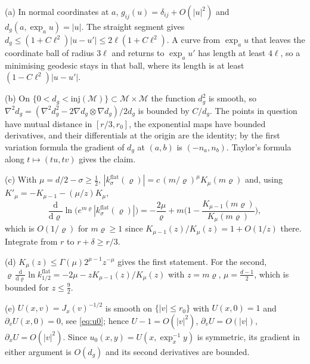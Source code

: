 \documentclass[11pt,a4paper]{article}
\makeatletter
\theoremstyle{stmt}
\theoremstyle{defn}
\theoremstyle{rmk}
\renewenvironment{proof}[1][\proofname]{\par\pushQED{\qed}\normalfont\topsep6\p@\@plus6\p@\relax
  \trivlist\item[\hskip\labelsep{\sffamily\itshape\small #1.}]\ignorespaces}{\popQED\endtrivlist\@endpefalse}
\numberwithin{equation}{section}
\newcommand{\M}{\mathcal{M}}
\newcommand{\dd}{\mathrm{d}}
\makeatother
\begin{document}
\begin{proof}
(a) In normal coordinates at $a$, $g_{ij}(u)=\delta_{ij}+O(|u|^2)$ and $d_g(a,\exp_au)=|u|$. The straight segment gives $d_g\le(1+C\ell^2)|u-u'|\le2\ell(1+C\ell^2)$. A curve from $\exp_au$ that leaves the coordinate ball of radius $3\ell$ and returns to $\exp_au'$ has length at least $4\ell$, so a minimising geodesic stays in that ball, where its length is at least $(1-C\ell^2)|u-u'|$.

(b) On $\{0<d_g<\mathrm{inj}(\M)\}\subset\M\times\M$ the function $d_g^2$ is smooth, so $\nabla^2d_g=(\nabla^2d_g^2-2\nabla d_g\otimes\nabla d_g)/2d_g$ is bounded by $C/d_g$. The points in question have mutual distance in $[r/3,r_0]$, the exponential maps have bounded derivatives, and their differentials at the origin are the identity; by the first variation formula the gradient of $d_g$ at $(a,b)$ is $(-n_a,n_b)$. Taylor's formula along $t\mapsto(tu,tv)$ gives the claim.

(c) With $\mu=d/2-\sigma\ge\tfrac12$, $|k^{\mathrm{flat}}_\sigma(\varrho)|=c\,(m/\varrho)^\mu K_\mu(m\varrho)$ and, using $K'_\mu=-K_{\mu-1}-(\mu/z)K_\mu$,
\[
\frac{\dd}{\dd\varrho}\ln\big(e^{m\varrho}|k^{\mathrm{flat}}_\sigma(\varrho)|\big)=-\frac{2\mu}{\varrho}+m\Big(1-\frac{K_{\mu-1}(m\varrho)}{K_\mu(m\varrho)}\Big),
\]
which is $O(1/\varrho)$ for $m\varrho\ge1$ since $K_{\mu-1}(z)/K_\mu(z)=1+O(1/z)$ there. Integrate from $r$ to $r+\delta\ge r/3$.

(d) $K_\mu(z)\le\Gamma(\mu)2^{\mu-1}z^{-\mu}$ gives the first statement. For the second, $\varrho\,\frac{\dd}{\dd\varrho}\ln k^{\mathrm{flat}}_{1/2}=-2\mu-zK_{\mu-1}(z)/K_\mu(z)$ with $z=m\varrho$, $\mu=\tfrac{d-1}2$, which is bounded for $z\le\tfrac92$.

(e) $U(x,v)=J_x(v)^{-1/2}$ is smooth on $\{|v|\le r_0\}$ with $U(x,0)=1$ and $\partial_vU(x,0)=0$, see \eqref{eq:u0}; hence $U-1=O(|v|^2)$, $\partial_vU=O(|v|)$, $\partial_xU=O(|v|^2)$. Since $u_0(x,y)=U(x,\exp_x^{-1}y)$ is symmetric, its gradient in either argument is $O(d_g)$ and its second derivatives are bounded.
\end{proof}
\end{document}
